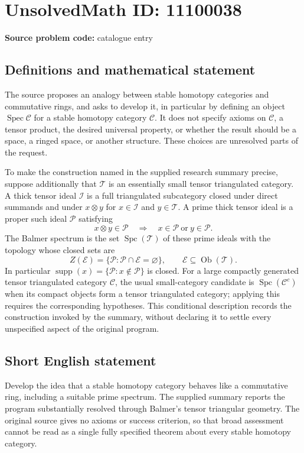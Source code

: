 \documentclass[11pt]{article}
\begin{document}
\section*{UnsolvedMath ID: 11100038}
\textbf{Source problem code:} catalogue entry
\subsection{Definitions and mathematical statement}
The source proposes an analogy between stable homotopy categories and commutative rings, and asks to develop it, in particular by defining an object $\operatorname{Spec}\mathcal C$ for a stable homotopy category $\mathcal C$. It does not specify axioms on $\mathcal C$, a tensor product, the desired universal property, or whether the result should be a space, a ringed space, or another structure. These choices are unresolved parts of the request.

To make the construction named in the supplied research summary precise, suppose additionally that $\mathcal T$ is an essentially small tensor triangulated category. A thick tensor ideal $\mathcal I$ is a full triangulated subcategory closed under direct summands and under $x\otimes y$ for $x\in\mathcal I$ and $y\in\mathcal T$. A prime thick tensor ideal is a proper such ideal $\mathcal P$ satisfying
\[
 x\otimes y\in\mathcal P\quad\Longrightarrow\quad x\in\mathcal P\ \text{or}\ y\in\mathcal P.
\]
The Balmer spectrum is the set $\operatorname{Spc}(\mathcal T)$ of these prime ideals with the topology whose closed sets are
\[
 Z(\mathcal E)=\{\mathcal P:\mathcal P\cap\mathcal E=\varnothing\},\qquad \mathcal E\subseteq\operatorname{Ob}(\mathcal T).
\]
In particular $\operatorname{supp}(x)=\{\mathcal P:x\notin\mathcal P\}$ is closed. For a large compactly generated tensor triangulated category $\mathcal C$, the usual small-category candidate is $\operatorname{Spc}(\mathcal C^c)$ when its compact objects form a tensor triangulated category; applying this requires the corresponding hypotheses. This conditional description records the construction invoked by the summary, without declaring it to settle every unspecified aspect of the original program.
\subsection{Short English statement}
Develop the idea that a stable homotopy category behaves like a commutative ring, including a suitable prime spectrum. The supplied summary reports the program substantially resolved through Balmer's tensor triangular geometry. The original source gives no axioms or success criterion, so that broad assessment cannot be read as a single fully specified theorem about every stable homotopy category.
\end{document}
